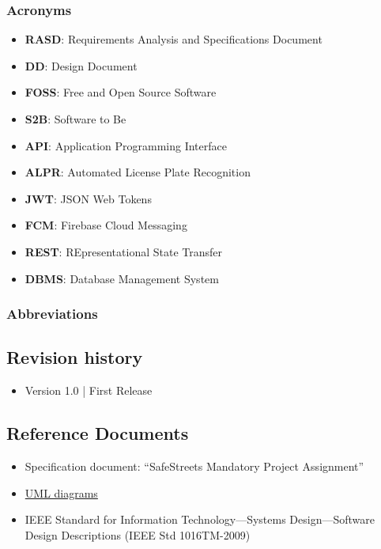 \documentclass{article}
\begin{document}
\subsubsection{Acronyms}
\begin{itemize}
	\item \textbf{RASD}: Requirements Analysis and Specifications Document  
	\item \textbf{DD}: Design Document
	\item \textbf{FOSS}: Free and Open Source Software
	\item \textbf{S2B}: Software to Be
	\item \textbf{API}: Application Programming Interface
	\item \textbf{ALPR}: Automated License Plate Recognition
	\item \textbf{JWT}: JSON Web Tokens
	\item \textbf{FCM}: Firebase Cloud Messaging
	\item \textbf{REST}: REpresentational State Transfer
	\item \textbf{DBMS}: Database Management System
\end{itemize}

\subsubsection{Abbreviations}

\subsection{Revision history}
\begin{itemize}
	\item Version 1.0 | First Release
\end{itemize}

\subsection{Reference Documents}
\begin{itemize}
	\item Specification document: “SafeStreets Mandatory Project Assignment” 	
	\item \href{https://www.uml-diagrams.org}{UML diagrams}
	\item IEEE Standard for Information Technology—Systems Design—Software Design Descriptions (IEEE Std 1016TM-2009)
\end{itemize}
\end{document}
